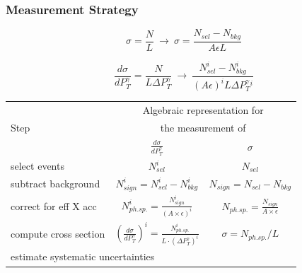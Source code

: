 \begin{frame}\frametitle{Measurement Strategy}
  \scriptsize
\begin{equation}
  \sigma = \frac{N}{L}~\rightarrow~\sigma = \frac{N_{sel}-N_{bkg}}{A \epsilon L}
\end{equation}

\begin{equation}
\frac{d\sigma}{dP_T^{\gamma}} = \frac{N}{L \Delta P_T^{\gamma}}~\rightarrow~\frac{N_{sel}^i-N_{bkg}^{i}}{(A\epsilon)^i L \Delta P_T^{\gamma}^i}
\end{equation}

\begin{table}[h]
  \scriptsize
  \begin{center}
  \begin{tabular}{|l|c|c|}
    \hline
          & \multicolumn{2}{|c|}{Algebraic representation for} \\ 
     Step & \multicolumn{2}{|c|}{the measurement of} \\ 
          & $\frac{d\sigma}{dP_{T}^{\gamma}}$ & $\sigma$ \\ \hline
    select events & {\bfseries{$N_{sel}^i$}} &    {\bfseries{$N_{sel}$}}       \\ \hline
    subtract background & {\bfseries{$N_{sign}^i = N_{sel}^i - N_{bkg}^i$}} &    {\bfseries{$N_{sign}=N_{sel}-N_{bkg}$}}       \\ \hline
    correct for eff X acc & $N_{ph.sp.}^i = \frac{N_{sign}^i}{(A \times\epsilon)^i}$ &  $N_{ph.sp.}=\frac{N_{sign}}{A\times\epsilon}$       \\ \hline
    compute cross section & $ \left( \frac{d\sigma}{dP_{T}^\gamma} \right) ^i = \frac{N_{ph.sp.}^i}{L \cdot (\Delta P_T^\gamma)^i}$  &  $\sigma = N_{ph.sp.}/L$       \\ \hline
    \multicolumn{3}{|l|}{estimate systematic uncertainties}          \\ \hline
  \end{tabular}
  \label{tab:analysisOutline}
  \end{center}
\end{table}
\end{frame}%
